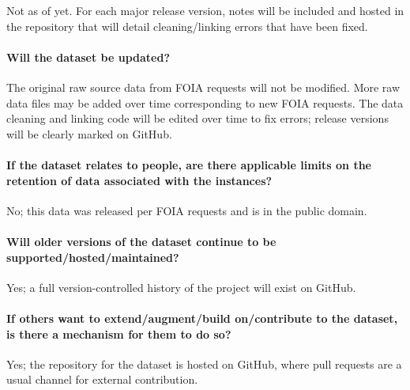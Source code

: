 Not as of yet. For each major release version, notes will be included and
hosted in the repository that will detail cleaning/linking errors that have been fixed.

\paragraph{Will the dataset be updated?}

The original raw source data from FOIA requests will not be modified. More raw
data files may be added over time corresponding to new FOIA requests. The data
cleaning and linking code will be edited over time to fix errors; release
versions will be clearly marked on GitHub.

\paragraph{If the dataset relates to people, are there applicable limits on the retention of data associated with the instances?}

No; this data was released per FOIA requests and is in the public domain.

\paragraph{Will older versions of the dataset continue to be supported/hosted/maintained?}

Yes; a full version-controlled history of the project will exist on GitHub.

\paragraph{If others want to extend/augment/build on/contribute to the dataset, is there a mechanism for them to do so?}

Yes; the repository for the dataset is hosted on GitHub, where pull requests are a usual channel for external contribution.
